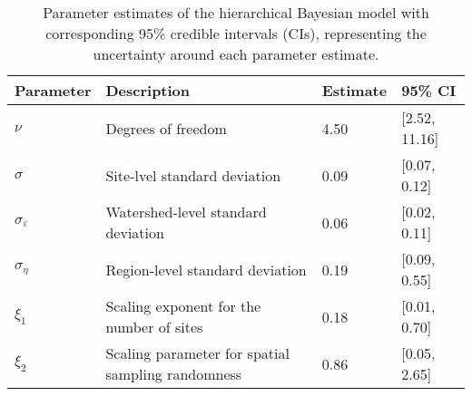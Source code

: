 \begin{table}[ht]
\centering
\caption{Parameter estimates of the hierarchical Bayesian model 
             with corresponding 95\% credible intervals (CIs), 
             representing the uncertainty around each parameter estimate.
             \label{tab:parms-est}} 
\begingroup\small
\begin{tabularx}{\textwidth}{llll}
  \hline
Parameter & Description & Estimate & 95\% CI \\ 
  \hline
$\nu$ & Degrees of freedom & 4.50 & [2.52, 11.16] \\ 
  $\sigma$ & Site-lvel standard deviation & 0.09 & [0.07, 0.12] \\ 
  $\sigma_{\varepsilon}$ & Watershed-level standard deviation & 0.06 & [0.02, 0.11] \\ 
  $\sigma_{\eta}$ & Region-level standard deviation & 0.19 & [0.09, 0.55] \\ 
  $\xi_{1}$ & Scaling exponent for the number of sites & 0.18 & [0.01, 0.70] \\ 
  $\xi_{2}$ & Scaling parameter for spatial sampling randomness & 0.86 & [0.05, 2.65] \\ 
   \hline
\end{tabularx}
\endgroup
\end{table}
